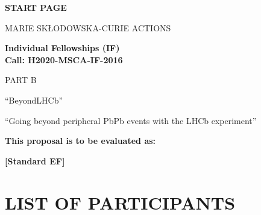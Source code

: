 \documentclass[a4paper,11pt]{article}
\newcommand{\acronym}{{\sc BeyondLHCb}\xspace} %
\newcommand{\fulltitle}{Going beyond peripheral PbPb events with the LHCb experiment\xspace}
\begin{document}
\phantom{a}
\vspace{15mm}
\begin{center}
        \Large{
     
        \textbf{START PAGE}
  
          \vspace{15mm}
          MARIE SKŁODOWSKA-CURIE ACTIONS\\
          \vspace{1cm}
          
          \textbf{Individual Fellowships (IF)}\\
          \textbf{Call: H2020-MSCA-IF-2016}
          \vspace{2cm}                   

          PART B
          \vspace{2.5cm}

          ``\acronym''
          \vspace{1cm}
          
          ``\fulltitle''
          \vspace{2cm}

          \textbf{This proposal is to be evaluated as:}
          \vspace{.5cm}

          \textbf{[Standard EF]}
        }
\end{center}
\vspace{1cm}

\newpage
\renewcommand{\contentsname}{TABLE OF CONTENTS}
\setcounter{tocdepth}{2}
\tableofcontents




\newpage
\section*{LIST OF PARTICIPANTS}
\label{sec:participants}

\newcommand\rotx[1]{\rotatebox[origin=c]{90}{\textbf{#1}}}
\newcommand\roty[1]{\rotatebox[origin=c]{90}{\parbox{4cm}{\raggedright\textbf{#1}}}}
\newcommand\MyHead[2]{\multicolumn{1}{l|}{\parbox{#1}{\centering #2}}}
\end{document}
